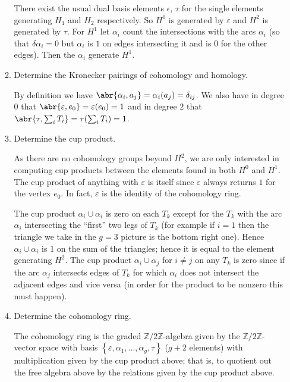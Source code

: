 \documentclass[11pt]{article}
\newcommand{\cbr}[1]{\left\{#1\right\}}
\begin{document}
\begin{enumerate}
\begin{enumerate}[label=(\alph*)]
        There exist the usual dual basis elements $\epsilon$, $\tau$ for the single elements generating $H_1$ and $H_2$ respectively. So $H^0$ is generated by $\varepsilon$ and $H^2$ is generated by $\tau$. For $H^1$ let $\alpha_i$ count the intersections with the arcs $\alpha_i$ (so that $\delta \alpha_i = 0$ but $\alpha_i$ is $1$ on edges intersecting it and is $0$ for the other edges). Then the $\alpha_i$ generate $H^1$.
        \item Determine the Kronecker pairings of cohomology and homology.
        
        By definition we have $\abr{\alpha_i,a_j} = \alpha_i(a_j) = \delta_{ij}$. We also have in degree $0$ that $\abr{\varepsilon,e_0} =\varepsilon(e_0) = 1$ and in degree $2$ that $\abr{\tau,\sum_i T_i} = \tau(\sum_i T_i) = 1$.
        \item Determine the cup product. 
        
        As there are no cohomology groups beyond $H^2$, we are only interested in computing cup products between the elements found in both $H^0$ and $H^1$. The cup product of anything with $\varepsilon$ is itself since $\varepsilon$ always returns $1$ for the vertex $e_0$. In fact, $\varepsilon$ is the identity of the cohomology ring.

        The cup product $\alpha_i\cup\alpha_i$ is zero on each $T_k$ except for the $T_k$ with the arc $\alpha_i$ intersecting the ``first'' two legs of $T_k$ (for example if $i = 1$ then the triangle we take in the $g = 3$ picture is the bottom right one). Hence $\alpha_i\cup\alpha_i$ is $1$ on the sum of the triangles; hence it is equal to the element generating $H^2$. The cup product $\alpha_i\cup\alpha_j$ for $i\neq j$ on any $T_k$ is zero since if the arc $\alpha_j$ intersects edges of $T_k$ for which $\alpha_i$ does not intersect the adjacent edges and vice versa (in order for the product to be nonzero this must happen).
        \item Determine the cohomology ring.
        
        The cohomology ring is the graded $\mathbb{Z}/2\mathbb{Z}$-algebra given by the $\mathbb{Z}/2\mathbb{Z}$-vector space with basis $\cbr{\varepsilon,\alpha_1,\dots,\alpha_g,\tau}$ ($g+2$ elements) with multiplication given by the cup product above; that is, to quotient out the free algebra above by the relations given by the cup product above. 
    \end{enumerate}
\end{enumerate}
\end{document}
